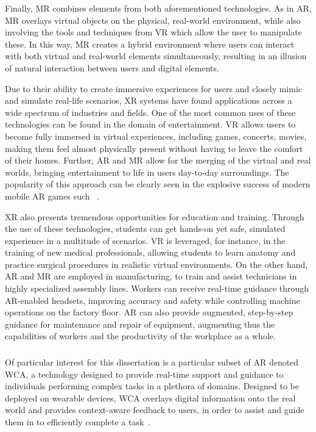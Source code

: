 Finally, \gls{MR} combines elements from both aforementioned technologies.
As in \gls{AR}, \gls{MR} overlays virtual objects on the physical, real-world environment, while also involving the tools and techniques from \gls{VR} which allow the user to manipulate these.
In this way, \gls{MR} creates a hybrid environment where users can interact with both virtual and real-world elements simultaneously, resulting in an illusion of natural interaction between users and digital elements.

\medskip

Due to their ability to create immersive experiences for users and closely mimic and simulate real-life scenarios, \gls{XR} systems have found applications across a wide spectrum of industries and fields.
One of the most common uses of these technologies can be found in the domain of entertainment.
\gls{VR} allows users to become fully immersed in virtual experiences, including games, concerts, movies, making them feel almost physically present without having to leave the comfort of their homes.
Further, \gls{AR} and \gls{MR} allow for the merging of the virtual and real worlds, bringing entertainment to life in users day-to-day surroundings.
The popularity of this approach can be clearly seen in the explosive success of modern mobile \gls{AR} games such ~\cite{pokemongo}.

\gls{XR} also presents tremendous opportunities for education and training.
Through the use of these technologies, students can get hands-on yet safe, simulated experience in a multitude of scenarios.
\gls{VR} is leveraged, for instance, in the training of new medical professionals, allowing students to learn anatomy and practice surgical procedures in realistic virtual environments.
On the other hand, \gls{AR} and \gls{MR} are employed in manufacturing, to train and assist technicians in highly specialized assembly lines.
Workers can receive real-time guidance through \gls{AR}-enabled headsets, improving accuracy and safety while controlling machine operations on the factory floor.
\gls{AR} can also provide augmented, step-by-step guidance for maintenance and repair of equipment, augmenting thus the capabilities of workers and the productivity of the workplace as a whole.

\subsubsection{}

Of particular interest for this dissertation is a particular subset of \gls{AR} denoted \acf{WCA}, a technology designed to provide real-time support and guidance to individuals performing complex tasks in a plethora of domains.
Designed to be deployed on wearable devices, \gls{WCA} overlays digital information onto the real world and provides context-aware feedback to users, in order to assist and guide them in to efficiently complete a task~\cite{ha2014towards,chen2015early,chen2018application,wang2020scaling}.

